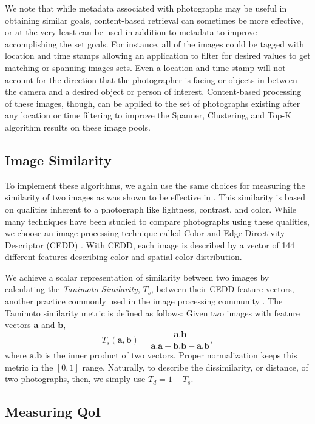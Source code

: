 We note that while metadata associated with photographs may be useful in obtaining similar goals, content-based retrieval can sometimes be more effective, or at the very least can be used in addition to metadata to improve accomplishing the set goals.  For instance, all of the images could be tagged with location and time stamps allowing an application to filter for desired values to get matching or spanning images sets.  Even a location and time stamp will not account for the direction that the photographer is facing or objects in between the camera and a desired object or person of interest.  Content-based processing of these images, though, can be applied to the set of photographs existing after any location or time filtering to improve the Spanner, Clustering, and Top-K algorithm results on these image pools.  

\subsection{Image Similarity}

To implement these algorithms, we again use the same choices for measuring the similarity of two images as was shown to be effective in \cite{mediascope}.  This similarity is based on qualities inherent to a photograph like lightness, contrast, and color.  While many techniques have been studied to compare photographs using these qualities, we choose an image-processing technique called Color and Edge Directivity Descriptor (CEDD) \cite{2008cedd}.  With CEDD, each image is described by a vector of 144 different features describing color and spatial color distribution.  

We achieve a scalar representation of similarity between two images by calculating the \emph{Tanimoto Similarity}, $T_s$, between their CEDD feature vectors, another practice commonly used in the image processing community \cite{tanimoto}. The Taminoto similarity metric is defined as follows: Given two images with feature vectors $\mathbf{a}$ and $\mathbf{b}$,
  \begin{equation}
  T_s(\mathbf{a,b})=\frac{\mathbf{a.b}}{\mathbf{a.a+b.b-a.b}},
  \end{equation}
where $\mathbf{a.b}$ is the inner product of two vectors. Proper normalization keeps this metric in the $[0,1]$ range. Naturally, to describe the dissimilarity, or distance, of two photographs, then, we simply use $T_d = 1 - T_s$.

\subsection{Measuring QoI}

